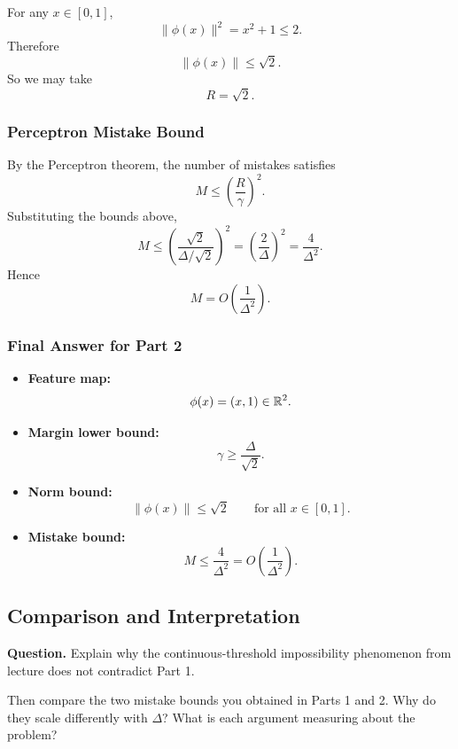 \documentclass{article}
\begin{document}
\begin{solutionbox}
For any $x\in[0,1]$,
\[
\|\phi(x)\|^2 = x^2+1 \le 2.
\]
Therefore
\[
\|\phi(x)\| \le \sqrt{2}.
\]
So we may take
\[
R=\sqrt{2}.
\]

\subsubsection{Perceptron Mistake Bound}

By the Perceptron theorem, the number of mistakes satisfies
\[
M \le \left(\frac{R}{\gamma}\right)^2.
\]
Substituting the bounds above,
\[
M
\le
\left(\frac{\sqrt{2}}{\Delta/\sqrt{2}}\right)^2
=
\left(\frac{2}{\Delta}\right)^2
=
\frac{4}{\Delta^2}.
\]
Hence
\[
M = O\!\left(\frac{1}{\Delta^2}\right).
\]

\subsubsection*{Final Answer for Part 2}

\begin{itemize}[leftmargin=2.5em]
    \item \textbf{Feature map:}
    \[
    \phi(x)=(x,1)\in\mathbb{R}^2.
    \]

    \item \textbf{Margin lower bound:}
    \[
    \gamma \ge \frac{\Delta}{\sqrt{2}}.
    \]

    \item \textbf{Norm bound:}
    \[
    \|\phi(x)\|\le \sqrt{2}
    \qquad \text{for all } x\in[0,1].
    \]

    \item \textbf{Mistake bound:}
    \[
    M\le \frac{4}{\Delta^2}
    =
    O\!\left(\frac{1}{\Delta^2}\right).
    \]
\end{itemize}

\end{solutionbox}

\subsection{Comparison and Interpretation}
\textbf{Question.}
\newline
Explain why the continuous-threshold impossibility phenomenon from lecture does
not contradict Part 1.

Then compare the two mistake bounds you obtained in Parts 1 and 2. Why do they
scale differently with $\Delta$? What is each argument measuring about the
problem?
\end{document}

